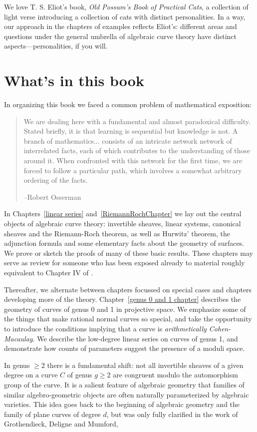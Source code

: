 We love T. S. Eliot's book, \emph{Old Possum's Book of Practical Cats}, a collection of light verse introducing a collection of cats with distinct personalities. In a way, our approach in the chapters of examples reflects Eliot's: different areas and questions under the general umbrella of algebraic curve theory have distinct aspects---personalities, if you will.


\section{What's in this book}
In organizing this book we faced a common problem of  mathematical exposition:
\begin{quote}
\small\sf
We are dealing here with a fundamental and almost paradoxical difficulty. Stated briefly, it is that learning is sequential but knowledge is not. A branch of mathematics... consists of an intricate network network of interrelated facts, each of which contributes to the understanding of those around it. When confronted with this network for the first time, we are forced to follow a particular path, which involves a somewhat arbitrary ordering of the facts.

--Robert Osserman\cite{Poetry}

\end{quote}

In Chapters~\ref{linear series} and~\ref{RiemannRochChapter} we lay out the central objects of algebraic curve theory: invertible sheaves, linear systems, canonical sheaves and the Riemann-Roch theorem, as well as
Hurwitz' theorem,
the adjunction formula and  some elementary facts about the geometry of surfaces. We prove or sketch the
proofs of many of these basic results. These chapters may serve as review for someone who has been exposed already to material roughly equivalent to Chapter IV of \cite{Hartshorne1977}. 

Thereafter, we alternate between chapters focussed on special cases and chapters developing more of the theory. Chapter~\ref{genus 0 and 1 chapter}  describes the geometry of curves of genus 0 and 1 in projective space. We emphasize some of the things that make rational normal curves so special, and take the opportunity to introduce the conditions implying that a curve is \emph{arithmetically Cohen-Macaulay}. We describe the low-degree linear series on curves of genus 1, and demonstrate how counts of parameters suggest the presence of a moduli space. 

In genus $\geq 2$ there is a fundamental shift: not all invertible sheaves of a given degree on a curve $C$ of genus $g \geq 2$ are congruent modulo the automorphism group of the curve.
It is a salient feature of algebraic geometry that families of similar algebro-geometric objects are often naturally parameterized by algebraic varieties. This idea goes back to the beginning of algebraic geometry and the family of plane curves of degree $d$, but was only fully clarified in the work of Grothendieck, Deligne and Mumford,

